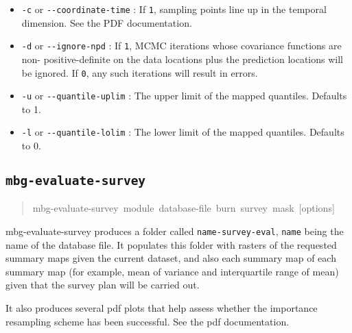 \begin{itemize}
\item \texttt{-c} or \texttt{-{}-coordinate-time} : If \texttt{1}, sampling points line up in the temporal dimension.
See the PDF documentation.

\item \texttt{-d} or \texttt{-{}-ignore-npd} : If \texttt{1}, MCMC iterations whose covariance functions are non-
positive-definite on the data locations plus the prediction locations will be ignored. If
\texttt{0}, any such iterations will result in errors.

\item \texttt{-u} or \texttt{-{}-quantile-uplim} : The upper limit of the mapped quantiles. Defaults to 1.

\item \texttt{-l} or \texttt{-{}-quantile-lolim} : The lower limit of the mapped quantiles. Defaults to 0.

\end{itemize}




\subsection{\texttt{mbg-evaluate-survey}%
}
%
\begin{quote}{\ttfamily \raggedright \noindent
mbg-evaluate-survey~module~database-file~burn~survey~mask~{[}options{]}
}
\end{quote}

mbg-evaluate-survey produces a folder called \texttt{name-survey-eval}, \texttt{name} being the name of the
database file. It populates this folder with rasters of the requested summary maps given the current
dataset, and also each summary map of each summary map (for example, mean of variance and
interquartile range of mean) given that the survey plan will be carried out.

It also produces several pdf plots that help assess whether the importance resampling scheme has been
successful. See the pdf documentation.





